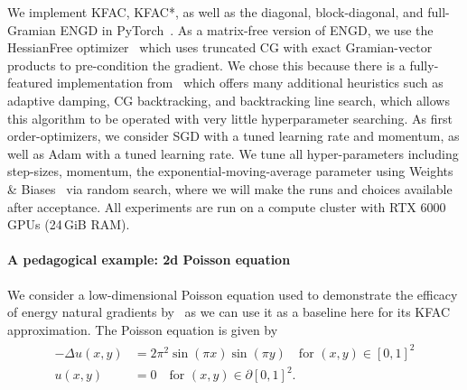 


We implement KFAC, KFAC*, as well as the diagonal, block-diagonal, and
full-Gramian ENGD in PyTorch~\citep{paszke2019pytorch}.
As a matrix-free version of ENGD, we use the HessianFree optimizer~\citep{martens2010deep} which uses truncated CG with exact Gramian-vector products to pre-condition the gradient.
We chose this because there is a fully-featured implementation from~\citet{tatzel2022late} which offers many additional heuristics such as adaptive damping, CG backtracking, and backtracking line search, which allows this algorithm to be operated with very little hyperparameter searching.
As first order-optimizers, we consider SGD with a tuned learning rate and momentum, as well as Adam with a tuned learning rate.
%
We tune all hyper-parameters including step-sizes, momentum, the exponential-moving-average parameter using Weights \& Biases~\citep{wandb} via random search, where we will make the runs and choices available after acceptance.
All experiments are run on a compute cluster with RTX 6000 GPUs (24\,GiB RAM).


\paragraph{A pedagogical example: 2d Poisson equation}

We consider a low-dimensional Poisson equation used to demonstrate the efficacy of energy natural gradients by~\cite{muller2023achieving}
as we can use it as a baseline here for its KFAC approximation.
The %
Poisson equation is given by
\begin{align}\label{eq:2D-Poisson}
    \begin{split}
        -\Delta u(x,y) & = 2\pi^2 \sin(\pi x) \sin(\pi y) \quad \text{for } (x,y)\in[0,1]^2 \\
    u(x,y) & = 0 \quad \text{for } (x,y) \in\partial[0,1]^2.
    \end{split}
\end{align}

